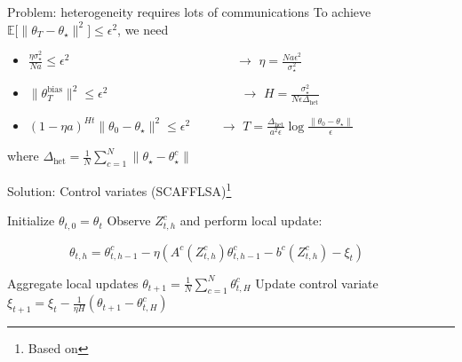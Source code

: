 \documentclass[aspectratio=169,14pt]{beamer}
\begin{document}
\begin{frame}{Problem: heterogeneity requires lots of communications}
  To achieve $\mathbb{E} \Big[ \| {\theta_T - \theta_\star} \|^2 \Big] \le \epsilon^2$, we need
  \begin{itemize}
  \item $\frac{\eta \sigma_\star^2}{N a} \le \epsilon^2$ ~~~~~~\,~~~~~~~~~~~~~~~~~~~ $\rightarrow$ $\eta = \frac{N a \epsilon^2}{\sigma_\star^2}$
  \item $\| \theta_T^{\text{bias}} \|^2 \le \epsilon^2$ ~~~~~~~~~~~~~~~~~~~~ $\rightarrow$ $H = \frac{\sigma_\star^2 }{N \epsilon \Delta_{\text{het}}}$
  \item $(1 - \eta a)^{H t} \| \theta_0 - \theta_\star \|^2 \le \epsilon^2$ ~~~~$\rightarrow$ $T = \frac{\Delta_{\text{het}}}{a^2 \epsilon} \log \tfrac{\| \theta_0 - \theta_\star \|}{ \epsilon }$
  \end{itemize}

  where $\Delta_{\text{het}} = \frac{1}{N} \sum_{c=1}^N \| \theta_\star - \theta_\star^c \| $
\end{frame}


\begin{frame}{Solution: Control variates (SCAFFLSA)\footnote{Based on }}

  \vspace{0.5em}

  \small

  \begin{algorithmic}
    \State Initialize $\theta_{t,0} = \theta_t$
    \State Observe $Z^c_{t,h}$ and perform local update:
    \begin{center}
      ~~~~~~~~~~$\theta_{t,h} = \theta_{t,h-1}^c - \eta( A^c(Z^c_{t,h}) \theta_{t,h-1}^c - b^c(Z^c_{t,h}) - \xi_t)$
    \end{center}
  \vspace{-0.2em}
    \EndFor
  \vspace{-0.2em}
    \EndFor
    \State Aggregate local updates $\theta_{t+1} = \tfrac{1}{N} \sum\nolimits_{c=1}^{N} \theta_{t,H}^c $
    \State Update control variate $\xi_{t+1} = \xi_t - \frac{1}{\eta H} ( \theta_{t+1} - \theta_{t,H}^c )$
    \EndFor
  \end{algorithmic}
  \vspace{1.5em}
\end{frame}
\end{document}
